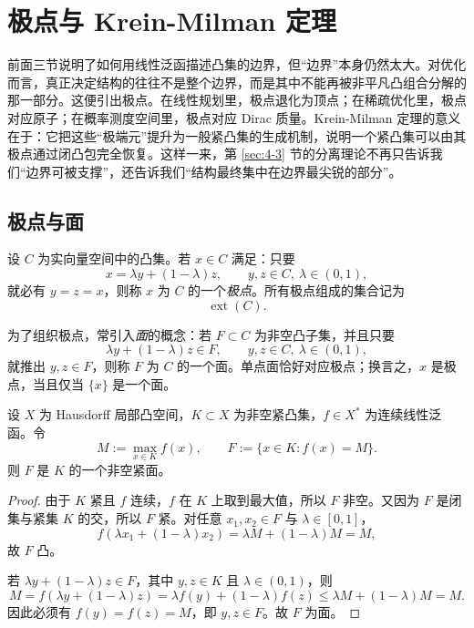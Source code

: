 \section{极点与 Krein-Milman 定理}

\label{sec:4-4}

前面三节说明了如何用线性泛函描述凸集的边界，但“边界”本身仍然太大。对优化而言，真正决定结构的往往不是整个边界，而是其中不能再被非平凡凸组合分解的那一部分。这便引出极点。在线性规划里，极点退化为顶点；在稀疏优化里，极点对应原子；在概率测度空间里，极点对应 Dirac 质量。Krein-Milman 定理的意义在于：它把这些“极端元”提升为一般紧凸集的生成机制，说明一个紧凸集可以由其极点通过闭凸包完全恢复。这样一来，第 \ref{sec:4-3} 节的分离理论不再只告诉我们“边界可被支撑”，还告诉我们“结构最终集中在边界最尖锐的部分”。

\subsection{极点与面}

\begin{definition}[极点]\label{def:extreme-point}
设 $C$ 为实向量空间中的凸集。若 $x\in C$ 满足：只要
\[
x=\lambda y+(1-\lambda)z,\qquad y,z\in C,\ \lambda\in(0,1),
\]
就必有 $y=z=x$，则称 $x$ 为 $C$ 的一个\emph{极点}。所有极点组成的集合记为
\[
\operatorname{ext}(C).
\]
\end{definition}

为了组织极点，常引入\emph{面}的概念：若 $F\subset C$ 为非空凸子集，并且只要
\[
\lambda y+(1-\lambda)z\in F,\qquad y,z\in C,\ \lambda\in(0,1),
\]
就推出 $y,z\in F$，则称 $F$ 为 $C$ 的一个面。单点面恰好对应极点；换言之，$x$ 是极点，当且仅当 $\{x\}$ 是一个面。

\begin{lemma}[暴露面]\label{lem:exposed-face}
设 $X$ 为 Hausdorff 局部凸空间，$K\subset X$ 为非空紧凸集，$f\in X^\ast$ 为连续线性泛函。令
\[
M:=\max_{x\in K} f(x),\qquad F:=\{x\in K:f(x)=M\}.
\]
则 $F$ 是 $K$ 的一个非空紧面。
\end{lemma}

\begin{proof}
由于 $K$ 紧且 $f$ 连续，$f$ 在 $K$ 上取到最大值，所以 $F$ 非空。又因为 $F$ 是闭集与紧集 $K$ 的交，所以 $F$ 紧。对任意 $x_1,x_2\in F$ 与 $\lambda\in[0,1]$，
\[
f(\lambda x_1+(1-\lambda)x_2)=\lambda M+(1-\lambda)M=M,
\]
故 $F$ 凸。

若 $\lambda y+(1-\lambda)z\in F$，其中 $y,z\in K$ 且 $\lambda\in(0,1)$，则
\[
M=f(\lambda y+(1-\lambda)z)=\lambda f(y)+(1-\lambda)f(z)\le \lambda M+(1-\lambda)M=M.
\]
因此必须有 $f(y)=f(z)=M$，即 $y,z\in F$。故 $F$ 为面。
\end{proof}

